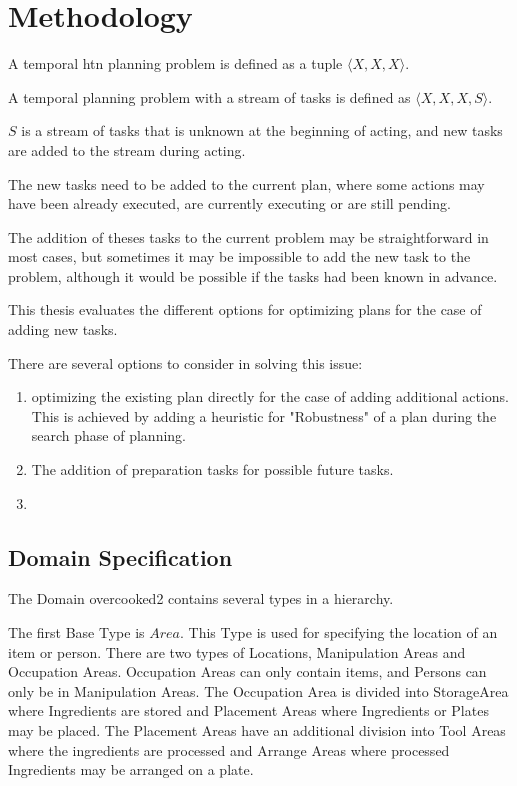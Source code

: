 \section{Methodology}\label{sec:methodology}


A temporal htn planning problem is defined as a tuple $\langle X,X,X \rangle$.

A temporal planning problem with a stream of tasks is defined as $\langle X,X,X,S \rangle$.

$S$ is a stream of tasks that is unknown at the beginning of acting, and new tasks are added to the stream during acting.

The new tasks need to be added to the current plan, where some actions may have been already executed, are currently executing or are still pending.

The addition of theses tasks to the current problem may be straightforward in most cases, but sometimes it may be impossible to add the new task to the problem, although it would be possible if the tasks had been known in advance.

This thesis evaluates the different options for optimizing plans for the case of adding new tasks.

There are several options to consider in solving this issue:

\begin{enumerate}
    \item optimizing the existing plan directly for the case of adding additional actions. This is achieved by adding a heuristic for "Robustness" of a plan during the search phase of planning.
    \item The addition of preparation tasks for possible future tasks. 
    \item {}
\end{enumerate}


\subsection{Domain Specification}

The Domain overcooked2 contains several types in a hierarchy.

The first Base Type is $Area$.
This Type is used for specifying the location of an item or person. There are two types of Locations, Manipulation Areas and Occupation Areas.
Occupation Areas can only contain items, and Persons can only be in Manipulation Areas.
The Occupation Area is divided into StorageArea where Ingredients are stored and Placement Areas where Ingredients or Plates may be placed.
The Placement Areas have an additional division into Tool Areas where the ingredients are processed and Arrange Areas where processed Ingredients may be arranged on a plate.

